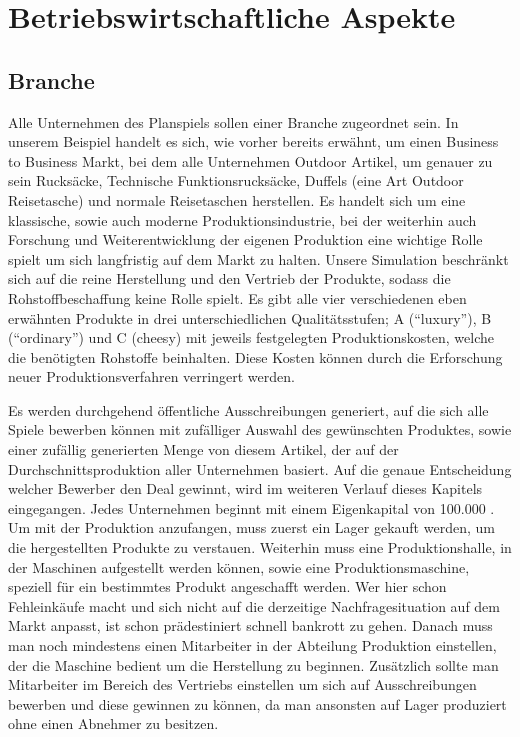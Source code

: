 \section{Betriebswirtschaftliche Aspekte}
\subsection{Branche}
Alle Unternehmen des Planspiels sollen einer Branche zugeordnet sein. In unserem Beispiel handelt es sich, wie vorher bereits erwähnt, um einen Business to Business Markt, bei dem alle Unternehmen Outdoor Artikel, um genauer zu sein Rucksäcke, Technische Funktionsrucksäcke, Duffels (eine Art Outdoor Reisetasche) und normale Reisetaschen herstellen. Es handelt sich um eine klassische, sowie auch moderne Produktionsindustrie, bei der weiterhin auch Forschung und Weiterentwicklung der eigenen Produktion eine wichtige Rolle spielt um sich langfristig auf dem Markt zu halten. Unsere Simulation beschränkt sich auf die reine Herstellung und den Vertrieb der Produkte, sodass die Rohstoffbeschaffung keine Rolle spielt. Es gibt alle vier verschiedenen eben erwähnten Produkte in drei unterschiedlichen Qualitätsstufen; A (\enquote{luxury}), B (\enquote{ordinary}) und C ({cheesy}) mit jeweils festgelegten Produktionskosten, welche die benötigten Rohstoffe beinhalten. Diese Kosten können durch die Erforschung neuer Produktionsverfahren verringert werden. 

Es werden durchgehend öffentliche Ausschreibungen generiert, auf die sich alle Spiele bewerben können mit zufälliger Auswahl des gewünschten Produktes, sowie einer zufällig generierten Menge von diesem Artikel, der auf der Durchschnittsproduktion aller Unternehmen basiert. Auf die genaue Entscheidung welcher Bewerber den Deal gewinnt, wird im weiteren Verlauf dieses Kapitels eingegangen. Jedes Unternehmen beginnt mit einem Eigenkapital von 100.000 \€. Um mit der Produktion anzufangen, muss zuerst ein Lager gekauft werden, um die hergestellten Produkte zu verstauen. Weiterhin muss eine Produktionshalle, in der Maschinen aufgestellt werden können, sowie eine Produktionsmaschine, speziell für ein bestimmtes Produkt angeschafft werden. Wer hier schon Fehleinkäufe macht und sich nicht auf die derzeitige Nachfragesituation auf dem Markt anpasst, ist schon prädestiniert schnell bankrott zu gehen. Danach muss man noch mindestens einen Mitarbeiter in der Abteilung Produktion einstellen, der die Maschine bedient um die Herstellung zu beginnen. Zusätzlich sollte man Mitarbeiter im Bereich des Vertriebs einstellen um sich auf Ausschreibungen bewerben und diese gewinnen zu können, da man ansonsten auf Lager produziert ohne einen Abnehmer zu besitzen. 

